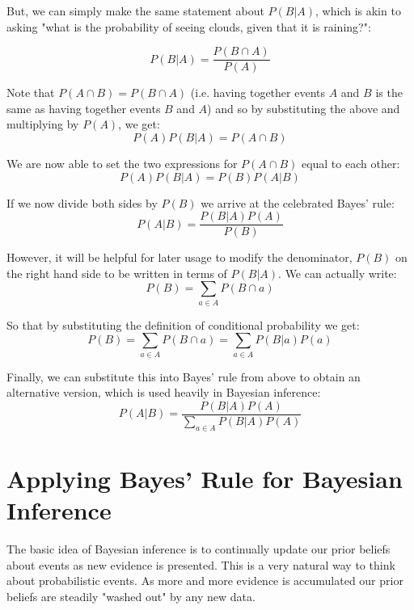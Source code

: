 But, we can simply make the same statement about $P(B|A)$, which is akin to asking "what is the probability of seeing clouds, given that it is raining?":

\begin{equation}
  P(B|A)=\frac{P(B\cap A)}{P(A)}
\end{equation}

Note that $P(A\cap B) = P(B\cap A)$ (i.e. having together events $A$ and $B$ is the same as having together events $B$ and $A$) and so by substituting the above and multiplying by $P(A)$, we get:
\begin{equation}
  P(A)P(B|A)=P(A\cap B)
\end{equation}

We are now able to set the two expressions for $P(A\cap B)$ equal to each other:
\begin{equation}
  P(A)P(B|A)=P(B)P(A|B)
\end{equation}

If we now divide both sides by $P(B)$ we arrive at the celebrated Bayes' rule:
\begin{equation}
  P(A|B)=\frac{P(B|A)P(A)}{P(B)}
\end{equation}

However, it will be helpful for later usage to modify the denominator, $P(B)$ on the right hand side to be written in terms of $P(B|A)$. We can actually write:
\begin{equation}
  P(B)=\sum_{a\in A}P(B\cap a)
\end{equation}


So that by substituting the definition of conditional probability we get:
\begin{equation}
  P(B)=\sum_{a\in A}P(B\cap a) = \sum_{a\in A}P(B|a)P(a)
\end{equation}

Finally, we can substitute this into Bayes' rule from above to obtain an alternative version, which is used heavily in Bayesian inference:
\begin{equation}
  P(A|B)=\frac{P(B|A)P(A)}{\sum_{a\in A}P(B|A)P(A)}
\end{equation}

\section{Applying Bayes' Rule for Bayesian Inference}
The basic idea of Bayesian inference is to continually update our prior beliefs about events as new evidence is presented. This is a very natural way to think about probabilistic events. As more and more evidence is accumulated our prior beliefs are steadily "washed out" by any new data.

